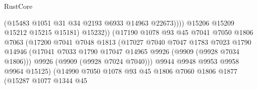 \begin{lexlean}{RustCore}
\begin{coremodule}
                                                (@15483 @1051 @31 @34 @2193 @6933 @14963 @22673))))
                                          @15206
                                          @15209
                                          @15212
                                          @15215
                                          @15181)
                                        @15232))
                                    (@17190
                                      @1078
                                      @93
                                      @45
                                      @7041
                                      @7050
                                      @1806
                                      @7063
                                      (@17200
                                        @7041
                                        @7048
                                        @1813
                                        (@17027
                                          @7040
                                          @7047
                                          @1783
                                          @7023
                                          @1790
                                          @14946
                                          (@17041
                                            @7033
                                            @1790
                                            @17047
                                            @14965
                                            @9926
                                            (@9909 (@9928 @7034 @1806)))
                                          @9926
                                          (@9909 (@9928 @7024 @7040)))
                                        @9944
                                        @9948
                                        @9953
                                        @9958
                                        @9964
                                        @15125)
                                      (@14990
                                        @7050
                                        @1078
                                        @93
                                        @45
                                        @1806
                                        @7060
                                        @1806
                                        @1877
                                        (@15287
                                          @1077
                                          @1344
                                          @45

\end{coremodule}
\end{lexlean}
